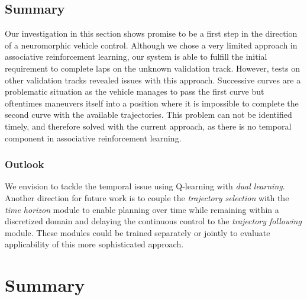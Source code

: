 \subsection{Summary}%
\label{subsec:summary_vehicle_control}

Our investigation in this section shows promise to be a first step in the direction of a neuromorphic vehicle control.
Although we chose a very limited approach in associative reinforcement learning, our system is able to fulfill the initial requirement to complete laps on the unknown validation track.
However, tests on other validation tracks revealed issues with this approach.
Successive curves are a problematic situation as the vehicle manages to pass the first curve but oftentimes maneuvers itself into a position where it is impossible to complete the second curve with the available trajectories.
This problem can not be identified timely, and therefore solved with the current approach, as there is no temporal component in associative reinforcement learning. 

\subsubsection{Outlook}%
\label{ssubsec:outlook}

We envision to tackle the temporal issue using Q-learning with \textit{dual learning}.
Another direction for future work is to couple the \emph{trajectory selection} with the \emph{time horizon} module to enable planning over time while remaining within a discretized domain and delaying the continuous control to the \emph{trajectory following} module.
These modules could be trained separately or jointly to evaluate applicability of this more sophisticated approach.


\section{Summary}%
\label{sec:summary_closed_loop_systems}


